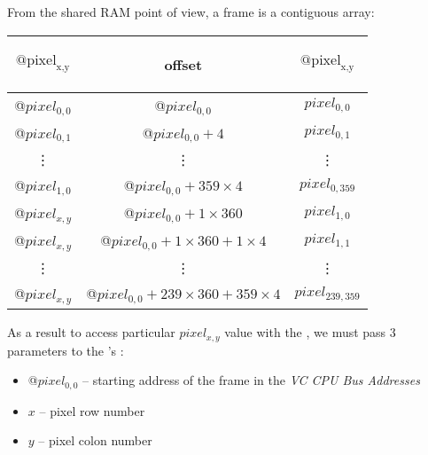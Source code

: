 From the shared RAM point of view, a frame is a contiguous array:
\begin{center}
\begin{tabular}{|c|c|c|}

	\hline
	\begin{bf}$\text{@pixel}_\text{{x,y}}$\end{bf} & \begin{bf}offset\end{bf} & \begin{bf}$\text{@pixel}_\text{{x,y}}$\end{bf} \\[10pt]

	\hline
	@$pixel_{0,0}$ & @$pixel_{0,0}$ & $pixel_{0,0}$ \\

	\hline
	@$pixel_{0,1}$ & @$pixel_{0,0} + 4$ & $pixel_{0,1}$ \\

	\hline
	\vdots & \vdots & \vdots \\

	\hline
	@$pixel_{1,0}$ & @$pixel_{0,0} + 359\times 4$ & $pixel_{0,359}$ \\

	\hline
	@$pixel_{x,y}$ & @$pixel_{0,0} + 1\times 360$ & $pixel_{1,0}$ \\

	\hline
	@$pixel_{x,y}$ & @$pixel_{0,0} + 1\times 360 + 1\times 4$ & $pixel_{1,1}$ \\

	\hline
	\vdots & \vdots & \vdots \\

	\hline
	@$pixel_{x,y}$ & @$pixel_{0,0} + 239\times 360 + 359\times 4$ & $pixel_{239,359}$ \\

	\hline

\end{tabular}
\end{center}
\FloatBarrier

As a result to access particular $pixel_{x,y}$ value with the \qpu, we must pass 3 parameters to the \vc's :
\begin{itemize}
	\item @$pixel_{0,0}$ -- starting address of the frame in the \emph{VC CPU Bus Addresses}
	\item $x$ -- pixel row number
	\item $y$ -- pixel colon number
\end{itemize}

